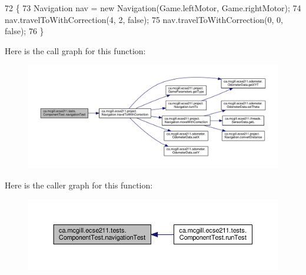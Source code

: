 \begin{DoxyCode}
72                                                                 \{
73     Navigation nav = \textcolor{keyword}{new} Navigation(Game.leftMotor, Game.rightMotor);
74     nav.travelToWithCorrection(4, 2, \textcolor{keyword}{false});
75     nav.travelToWithCorrection(0, 0, \textcolor{keyword}{false});
76   \}
\end{DoxyCode}
Here is the call graph for this function\+:
\nopagebreak
\begin{figure}[H]
\begin{center}
\leavevmode
\includegraphics[width=350pt]{enumca_1_1mcgill_1_1ecse211_1_1tests_1_1_component_test_aa40592bb550b3526402faddbc0d890c7_cgraph}
\end{center}
\end{figure}
Here is the caller graph for this function\+:
\nopagebreak
\begin{figure}[H]
\begin{center}
\leavevmode
\includegraphics[width=350pt]{enumca_1_1mcgill_1_1ecse211_1_1tests_1_1_component_test_aa40592bb550b3526402faddbc0d890c7_icgraph}
\end{center}
\end{figure}
\mbox{\label{enumca_1_1mcgill_1_1ecse211_1_1tests_1_1_component_test_a1ecca45b47067d825683cf46dcf22b62}} 
